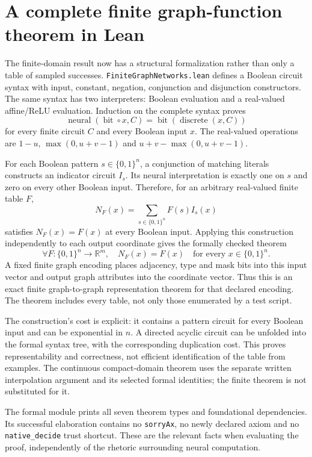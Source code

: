 \section{A complete finite graph-function theorem in Lean}

The finite-domain result now has a structural formalization rather than only a table of sampled successes. \texttt{FiniteGraphNetworks.lean} defines a Boolean circuit syntax with input, constant, negation, conjunction and disjunction constructors. The same syntax has two interpreters: Boolean evaluation and a real-valued affine/ReLU evaluation. Induction on the complete syntax proves
\[
 \operatorname{neural}(\operatorname{bit}\circ x,C)
 =\operatorname{bit}(\operatorname{discrete}(x,C))
\]
for every finite circuit $C$ and every Boolean input $x$. The real-valued operations are $1-u$, $\max(0,u+v-1)$ and $u+v-\max(0,u+v-1)$.

For each Boolean pattern $s\in\{0,1\}^n$, a conjunction of matching literals constructs an indicator circuit $I_s$. Its neural interpretation is exactly one on $s$ and zero on every other Boolean input. Therefore, for an arbitrary real-valued finite table $F$,
\[
 N_F(x)=\sum_{s\in\{0,1\}^n}F(s)I_s(x)
\]
satisfies $N_F(x)=F(x)$ at every Boolean input. Applying this construction independently to each output coordinate gives the formally checked theorem
\[
 \forall F:\{0,1\}^n\to\mathbb R^m,\quad
 N_F(x)=F(x)\quad\text{for every }x\in\{0,1\}^n.
\]
A fixed finite graph encoding places adjacency, type and mask bits into this input vector and output graph attributes into the coordinate vector. Thus this is an exact finite graph-to-graph representation theorem for that declared encoding. The theorem includes every table, not only those enumerated by a test script.

The construction's cost is explicit: it contains a pattern circuit for every Boolean input and can be exponential in $n$. A directed acyclic circuit can be unfolded into the formal syntax tree, with the corresponding duplication cost. This proves representability and correctness, not efficient identification of the table from examples. The continuous compact-domain theorem uses the separate written interpolation argument and its selected formal identities; the finite theorem is not substituted for it.

The formal module prints all seven theorem types and foundational dependencies. Its successful elaboration contains no \texttt{sorryAx}, no newly declared axiom and no \texttt{native\_decide} trust shortcut. These are the relevant facts when evaluating the proof, independently of the rhetoric surrounding neural computation.
